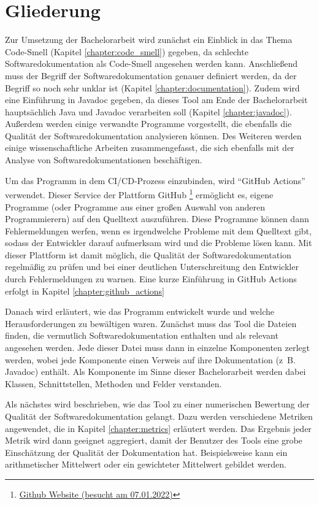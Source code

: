 \section{Gliederung}
Zur Umsetzung der Bachelorarbeit wird zunächst ein Einblick in das Thema Code-Smell (Kapitel \ref{chapter:code_smell}) gegeben, da schlechte Softwaredokumentation als Code-Smell angesehen werden kann. Anschließend muss der Begriff der Softwaredokumentation genauer definiert werden, da der Begriff so noch sehr unklar ist    (Kapitel \ref{chapter:documentation}). Zudem wird eine Einführung in Javadoc gegeben, da dieses Tool am Ende der Bachelorarbeit hauptsächlich Java und Javadoc verarbeiten soll (Kapitel \ref{chapter:javadoc}). 
Außerdem werden einige verwandte Programme vorgestellt, die ebenfalls die Qualität der Softwaredokumentation analysieren können. Des Weiteren werden einige wissenschaftliche Arbeiten zusammengefasst, die sich ebenfalls mit der Analyse von Softwaredokumentationen beschäftigen.

Um das Programm in dem \ac{CI/CD}-Prozess einzubinden, wird \enquote{GitHub Actions} verwendet. Dieser Service der Plattform GitHub \footnote{\href{https://github.com/}{Github Website (besucht am 07.01.2022)}} ermöglicht es, eigene Programme (oder Programme aus einer großen Auswahl von anderen Programmierern) auf den Quelltext auszuführen.  Diese Programme können dann Fehlermeldungen werfen, wenn es irgendwelche Probleme mit dem Quelltext gibt, sodass der Entwickler darauf aufmerksam wird und die Probleme lösen kann. Mit dieser Plattform ist damit möglich, die Qualität der Softwaredokumentation regelmäßig zu prüfen und bei einer deutlichen Unterschreitung den Entwickler durch Fehlermeldungen zu warnen.  Eine kurze Einführung in GitHub Actions erfolgt in Kapitel \ref{chapter:github_actions}

Danach wird erläutert, wie das Programm entwickelt wurde und welche Herausforderungen zu bewältigen waren. Zunächst muss das Tool die Dateien finden, die vermutlich Softwaredokumentation enthalten und als relevant angesehen werden. Jede dieser Datei muss dann in einzelne Komponenten zerlegt werden, wobei jede Komponente einen Verweis auf ihre Dokumentation (z~B. Javadoc) enthält. Als Komponente im Sinne dieser Bachelorarbeit werden dabei Klassen, Schnittstellen, Methoden und Felder verstanden.

Als nächstes wird beschrieben, wie das Tool zu einer numerischen Bewertung der Qualität der Softwaredokumentation gelangt. Dazu werden verschiedene Metriken angewendet, die in Kapitel \ref{chapter:metrics} erläutert werden. Das Ergebnis jeder Metrik wird dann geeignet aggregiert, damit der Benutzer des Tools eine grobe Einschätzung der Qualität der Dokumentation hat. Beispielsweise kann ein arithmetischer Mittelwert oder ein gewichteter Mittelwert gebildet werden. 

